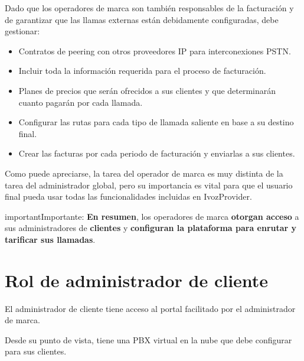 \documentclass[letterpaper,10pt,spanish]{sphinxmanual}
\begin{document}
Dado que los operadores de marca son también responsables de la facturación y de garantizar que las llamas externas están debidamente configuradas, debe gestionar:
\begin{itemize}
\item {} 
Contratos de peering con otros proveedores IP para interconexiones PSTN.

\item {} 
Incluir toda la información requerida para el proceso de facturación.

\item {} 
Planes de precios que serán ofrecidos a sus clientes y que determinarán cuanto pagarán por cada llamada.

\item {} 
Configurar las rutas para cada tipo de llamada saliente en base a su destino final.

\item {} 
Crear las facturas por cada periodo de facturación y enviarlas a sus clientes.

\end{itemize}

Como puede apreciarse, la tarea del operador de marca es muy distinta de la tarea del administrador global, pero su importancia es vital para que el usuario final pueda usar todas las funcionalidades incluidas en IvozProvider.
\label{basic_concepts/operation_roles/index:brand-responsibilities}
\begin{notice}{important}{Importante:}
\textbf{En resumen}, los operadores de marca \textbf{otorgan acceso} a sus administradores de \textbf{clientes} y \textbf{configuran la plataforma para enrutar y tarificar sus llamadas}.
\end{notice}


\section{Rol de administrador de cliente}
\label{basic_concepts/operation_roles/index:client-administrator-role}
El administrador de cliente tiene acceso al portal facilitado por el administrador de marca.

Desde su punto de vista, tiene una PBX virtual en la nube que debe configurar para sus clientes.
\end{document}
